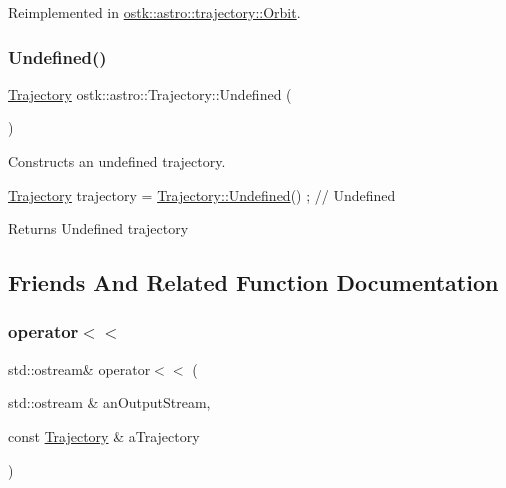 Reimplemented in \hyperlink{classostk_1_1astro_1_1trajectory_1_1_orbit_ae890e832785f84c3f03c1e103f952826}{ostk\+::astro\+::trajectory\+::\+Orbit}.

\mbox{\label{classostk_1_1astro_1_1_trajectory_a87873d63cae80dff7e43c97dc9b3668f}} 
\subsubsection{\texorpdfstring{Undefined()}{Undefined()}}
{\footnotesize\ttfamily \hyperlink{classostk_1_1astro_1_1_trajectory}{Trajectory} ostk\+::astro\+::\+Trajectory\+::\+Undefined (\begin{DoxyParamCaption}{ }\end{DoxyParamCaption})\hspace{0.3cm}{\ttfamily [static]}}



Constructs an undefined trajectory. 


\begin{DoxyCode}
\hyperlink{classostk_1_1astro_1_1_trajectory_a9333200bd6afed5aef4f5aad8a2a8e84}{Trajectory} trajectory = \hyperlink{classostk_1_1astro_1_1_trajectory_a87873d63cae80dff7e43c97dc9b3668f}{Trajectory::Undefined}() ; \textcolor{comment}{// Undefined}
\end{DoxyCode}


\begin{DoxyReturn}{Returns}
Undefined trajectory 
\end{DoxyReturn}


\subsection{Friends And Related Function Documentation}
\mbox{\label{classostk_1_1astro_1_1_trajectory_aef0327f0240dc2d71eca34dc287f88ea}} 
\subsubsection{\texorpdfstring{operator$<$$<$}{operator<<}}
{\footnotesize\ttfamily std\+::ostream\& operator$<$$<$ (\begin{DoxyParamCaption}\item[{std\+::ostream \&}]{an\+Output\+Stream,  }\item[{const \hyperlink{classostk_1_1astro_1_1_trajectory}{Trajectory} \&}]{a\+Trajectory }\end{DoxyParamCaption})\hspace{0.3cm}{\ttfamily [friend]}}



